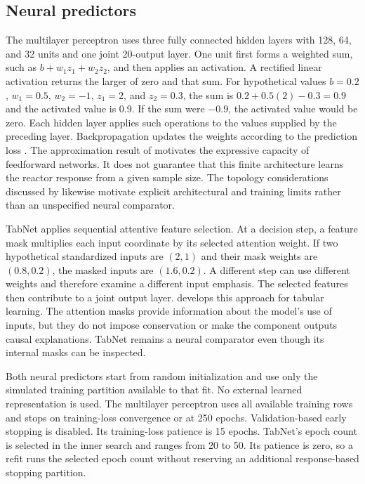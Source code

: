 \subsection{Neural predictors}

The multilayer perceptron uses three fully connected hidden layers with 128, 64, and 32 units and one joint 20-output layer. One unit first forms a weighted sum, such as $b+w_1z_1+w_2z_2$, and then applies an activation. A rectified linear activation returns the larger of zero and that sum. For hypothetical values $b=0.2$, $w_1=0.5$, $w_2=-1$, $z_1=2$, and $z_2=0.3$, the sum is $0.2+0.5(2)-0.3=0.9$ and the activated value is 0.9. If the sum were $-0.9$, the activated value would be zero. Each hidden layer applies such operations to the values supplied by the preceding layer. Backpropagation updates the weights according to the prediction loss \citep{Rumelhart1986}. The approximation result of \citet{Hornik1989} motivates the expressive capacity of feedforward networks. It does not guarantee that this finite architecture learns the reactor response from a given sample size. The topology considerations discussed by \citet{Curteanu2011} likewise motivate explicit architectural and training limits rather than an unspecified neural comparator.

TabNet applies sequential attentive feature selection. At a decision step, a feature mask multiplies each input coordinate by its selected attention weight. If two hypothetical standardized inputs are $(2,1)$ and their mask weights are $(0.8,0.2)$, the masked inputs are $(1.6,0.2)$. A different step can use different weights and therefore examine a different input emphasis. The selected features then contribute to a joint output layer. \citet{ArikPfister2021} develops this approach for tabular learning. The attention masks provide information about the model's use of inputs, but they do not impose conservation or make the component outputs causal explanations. TabNet remains a neural comparator even though its internal masks can be inspected.

Both neural predictors start from random initialization and use only the simulated training partition available to that fit. No external learned representation is used. The multilayer perceptron uses all available training rows and stops on training-loss convergence or at 250 epochs. Validation-based early stopping is disabled. Its training-loss patience is 15 epochs. TabNet's epoch count is selected in the inner search and ranges from 20 to 50. Its patience is zero, so a refit runs the selected epoch count without reserving an additional response-based stopping partition.

